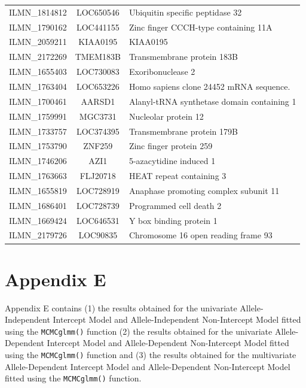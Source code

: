 \begin{xltabular}[!htb]{\textwidth}{|c|c|X|}
  ILMN\_1814812 & LOC650546 & Ubiquitin specific peptidase 32 \\ 
  ILMN\_1790162 & LOC441155 & Zinc finger CCCH-type containing 11A \\ 
  ILMN\_2059211 & KIAA0195 & KIAA0195 \\ 
  ILMN\_2172269 & TMEM183B & Transmembrane protein 183B \\ 
  ILMN\_1655403 & LOC730083 & Exoribonuclease 2 \\ 
  ILMN\_1763404 & LOC653226 & Homo sapiens clone 24452 mRNA sequence. \\ 
  ILMN\_1700461 & AARSD1 & Alanyl-tRNA synthetase domain containing 1 \\ 
  ILMN\_1759991 & MGC3731 & Nucleolar protein 12 \\ 
  ILMN\_1733757 & LOC374395 & Transmembrane protein 179B \\ 
  ILMN\_1753790 & ZNF259 & Zinc finger protein 259 \\ 
  ILMN\_1746206 & AZI1 & 5-azacytidine induced 1 \\ 
  ILMN\_1763663 & FLJ20718 & HEAT repeat containing 3 \\ 
  ILMN\_1655819 & LOC728919 & Anaphase promoting complex subunit 11 \\ 
  ILMN\_1686401 & LOC728739 & Programmed cell death 2 \\ 
  ILMN\_1669424 & LOC646531 & Y box binding protein 1 \\ 
  ILMN\_2179726 & LOC90835 & Chromosome 16 open reading frame 93 \\ 

   \hline
\end{xltabular}

\section*{Appendix E}
\renewcommand{\thefigure}{E\arabic{figure}}
\renewcommand{\thetable}{E\arabic{table}}
\setcounter{figure}{0}
\setcounter{table}{0}

{}


Appendix E contains (1) the results obtained for the univariate Allele-Independent Intercept Model and Allele-Independent Non-Intercept Model fitted using the \texttt{MCMCglmm()} function (2) the results obtained for the univariate Allele-Dependent Intercept Model and Allele-Dependent Non-Intercept Model fitted using the \texttt{MCMCglmm()} function and (3) the results obtained for the multivariate Allele-Dependent Intercept Model and Allele-Dependent Non-Intercept Model fitted using the \texttt{MCMCglmm()} function.

